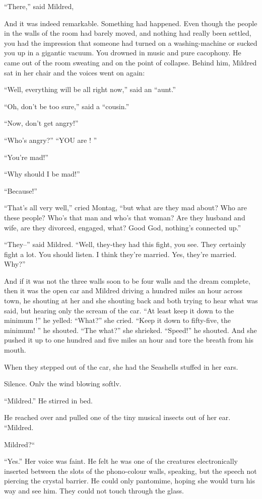 \documentclass[11pt,openany]{book}
\begin{document}
``There,'' said Mildred,

And it was indeed remarkable. Something had happened. Even though the people in the walls of the room had barely moved, and nothing had really been settled, you had the impression that someone had turned on a washing-machine or sucked you up in a gigantic vacuum. You drowned in music and pure cacophony. He came out of the room sweating and on the point of collapse. Behind him, Mildred sat in her chair and the voices went on again:

``Well, everything will be all right now,'' said an ``aunt.''

``Oh, don't be too sure,'' said a ``cousin.''

``Now, don't get angry!''

``Who's angry?'' ``YOU are ! ''

``You're mad!''

``Why should I be mad!''

``Because!''

``That's all very well,'' cried Montag, ``but what are they mad about? Who are these people? Who's that man and who's that woman? Are they husband and wife, are they divorced, engaged, what? Good God, nothing's connected up.''

``They--'' said Mildred. ``Well, they-they had this fight, you see. They certainly fight a lot. You should listen. I think they're married. Yes, they're married. Why?''

And if it was not the three walls soon to be four walls and the dream complete, then it was the open car and Mildred driving a hundred miles an hour across town, he shouting at her and she shouting back and both trying to hear what was said, but hearing only the scream of the car. ``At least keep it down to the minimum !'' he yelled: ``What?'' she cried. ``Keep it down to fifty-five, the minimum! '' he shouted. ``The what?'' she shrieked. ``Speed!'' he shouted. And she pushed it up to one hundred and five miles an hour and tore the breath from his mouth.

When they stepped out of the car, she had the Seashells stuffed in her ears.

Silence. Onlv the wind blowing softlv.

``Mildred.'' He stirred in bed.

He reached over and pulled one of the tiny musical insects out of her ear. ``Mildred.

Mildred?``

``Yes.'' Her voice was faint. He felt he was one of the creatures electronically inserted between the slots of the phono-colour walls, speaking, but the speech not piercing the crystal barrier. He could only pantomime, hoping she would turn his way and see him. They could not touch through the glass.
\end{document}
